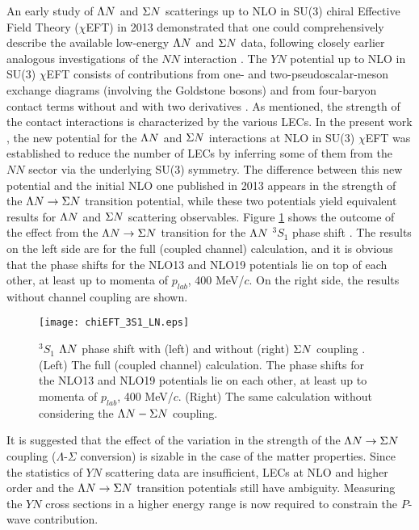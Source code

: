 An early study of $\Lambda N$ and $\Sigma N$ scatterings up to NLO in SU(3) chiral Effective Field Theory ($\chi$EFT) in 2013 demonstrated that one could comprehensively describe the available low-energy $\Lambda N$ and $\Sigma N$ data, following closely earlier analogous investigations of the $NN$ interaction \cite{chiEFT-2013}. The $YN$ potential up to NLO in SU(3) $\chi$EFT consists of contributions from one- and two-pseudoscalar-meson exchange diagrams (involving the Goldstone bosons) and from four-baryon contact terms without and with two derivatives \cite{chiEFT-2020}. As mentioned, the strength of the contact interactions is characterized by the various LECs. In the present work \cite{chiEFT-2020}, the new potential for the $\Lambda N$ and $\Sigma N$ interactions at NLO in SU(3) $\chi$EFT was established to reduce the number of LECs by inferring some of them from the $NN$ sector via the underlying SU(3) symmetry. The difference between this new potential and the initial NLO one published in 2013 \cite{chiEFT-2013} appears in the strength of the $\Lambda N\to\Sigma N$ transition potential, while these two potentials yield equivalent results for $\Lambda N$ and $\Sigma N$ scattering observables. Figure \ref{fig-chiEFT_3S1_LN} shows the outcome of the effect from the $\Lambda N\to\Sigma N$ transition for the $\Lambda N$ $^3S_1$ phase shift \cite{chiEFT-2020}. The results on the left side are for the full (coupled channel) calculation, and it is obvious that the phase shifts for the NLO13 and NLO19 potentials lie on top of each other, at least up to momenta of $p_{lab}$, 400 MeV/$c$. On the right side, the results without channel coupling are shown.
\begin{figure}[h]
 \begin{center}
   \texttt{[image: chiEFT\_3S1\_LN.eps]}
   \caption{$^3S_1$ $\Lambda N$ phase shift with (left) and without (right) $\Sigma N$ coupling \cite{chiEFT-2020}. (Left) The full (coupled channel) calculation. The phase shifts for the NLO13 and NLO19 potentials lie on each other, at least up to momenta of $p_{lab}$, 400 MeV/$c$. (Right) The same calculation without considering the $\Lambda N - \Sigma N$ coupling.}
   \label{fig-chiEFT_3S1_LN}
 \end{center}
\end{figure}

It is suggested that the effect of the variation in the strength of the $\Lambda N\to\Sigma N$ coupling ($\Lambda$-$\Sigma$ conversion) is sizable in the case of the matter properties. %
Since the statistics of $YN$ scattering data are insufficient, LECs at NLO and higher order and the $\Lambda N\to\Sigma N$ transition potentials still have ambiguity. Measuring the $YN$ cross sections in a higher energy range is now required to constrain the $P$-wave contribution. %


